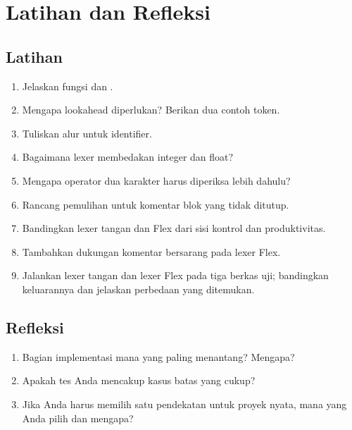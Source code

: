 \section*{Latihan dan Refleksi}

\subsection*{Latihan}
\begin{enumerate}[label=\arabic*.,leftmargin=*]
  \item Jelaskan fungsi  dan .
  \item Mengapa lookahead diperlukan? Berikan dua contoh token.
  \item Tuliskan alur  untuk identifier.
  \item Bagaimana lexer membedakan integer dan float?
  \item Mengapa operator dua karakter harus diperiksa lebih dahulu?
  \item Rancang pemulihan untuk komentar blok yang tidak ditutup.
  \item Bandingkan lexer tangan dan Flex dari sisi kontrol dan
        produktivitas.
  \item Tambahkan dukungan komentar bersarang pada lexer Flex.
  \item Jalankan lexer tangan dan lexer Flex pada tiga berkas uji;
        bandingkan keluarannya dan jelaskan perbedaan yang ditemukan.
\end{enumerate}

\subsection*{Refleksi}
\begin{reflectionbox}
\begin{enumerate}[label=\arabic*.,leftmargin=*]
  \item Bagian implementasi mana yang paling menantang? Mengapa?
  \item Apakah tes Anda mencakup kasus batas yang cukup?
  \item Jika Anda harus memilih satu pendekatan untuk proyek nyata,
        mana yang Anda pilih dan mengapa?
\end{enumerate}
\end{reflectionbox}

